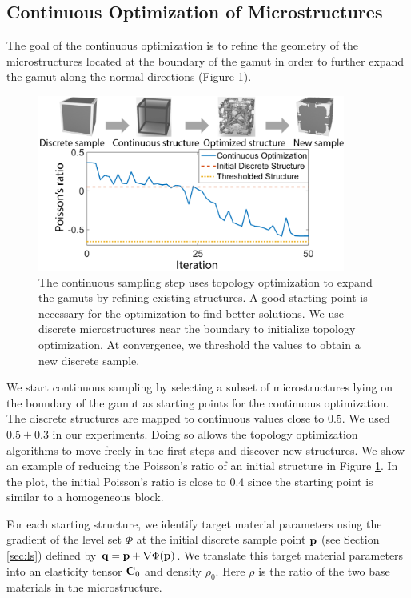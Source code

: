 \subsection{Continuous Optimization of Microstructures}
The goal of the continuous optimization is to refine the geometry of the microstructures located at the boundary of the gamut in order to further expand the gamut along the normal directions (Figure \ref{fig:contMicro}).
\begin{figure}[h]
	\centering
	\includegraphics[width=0.9\textwidth]{images/contOpt.png}
	\vspace{-0.2cm}
	\caption{The continuous sampling step uses topology optimization to expand the gamuts by refining existing structures. A good starting point is necessary for the optimization to find better solutions. 
		We use discrete microstructures near the boundary to initialize topology optimization. 
		At convergence, we threshold the values to obtain a new discrete sample.}
	\label{fig:contMicro}
\end{figure}
We start continuous sampling by selecting a subset of microstructures lying on the boundary of the gamut as starting points for the continuous optimization. The discrete structures are mapped to continuous values close to $0.5$. We used $0.5\pm0.3$ in our experiments. Doing so allows the topology optimization algorithms to move freely in the first steps and discover new structures.
We show an example of reducing the Poisson's ratio of an initial structure in Figure \ref{fig:contMicro}. In the plot, the initial Poisson's ratio is close to $0.4$ since the starting point is similar to a homogeneous block.

For each starting structure, we identify target material parameters using the gradient of the level set $\Phi$ at the initial discrete sample point $\bf p$ (see Section \ref{sec:ls}) defined by ${\bf q} = {\bf p} + \nabla \Phi ({\bf p})$. We translate this target material parameters into an elasticity tensor $\mathbf{C}_0$ and density $\rho_0$. Here $\rho$ is the ratio of the two base materials in the microstructure.

